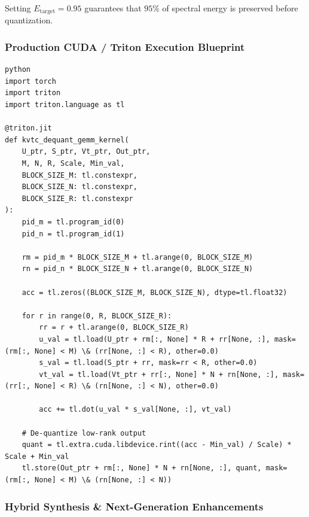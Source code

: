 Setting $E_{\text{target}} = 0.95$ guarantees that $95\%$ of spectral energy is preserved before quantization.


\subsubsection*{Production CUDA / Triton Execution Blueprint}

\vspace{0.5em}
\begin{mdframed}[backgroundcolor=codebg, linecolor=codeframe, linewidth=1pt, roundcorner=4pt, innerleftmargin=2pt, innerrightmargin=5pt, innertopmargin=5pt, innerbottommargin=5pt]
\begin{lstlisting}
python
import torch
import triton
import triton.language as tl

@triton.jit
def kvtc_dequant_gemm_kernel(
    U_ptr, S_ptr, Vt_ptr, Out_ptr,
    M, N, R, Scale, Min_val,
    BLOCK_SIZE_M: tl.constexpr,
    BLOCK_SIZE_N: tl.constexpr,
    BLOCK_SIZE_R: tl.constexpr
):
    pid_m = tl.program_id(0)
    pid_n = tl.program_id(1)

    rm = pid_m * BLOCK_SIZE_M + tl.arange(0, BLOCK_SIZE_M)
    rn = pid_n * BLOCK_SIZE_N + tl.arange(0, BLOCK_SIZE_N)

    acc = tl.zeros((BLOCK_SIZE_M, BLOCK_SIZE_N), dtype=tl.float32)

    for r in range(0, R, BLOCK_SIZE_R):
        rr = r + tl.arange(0, BLOCK_SIZE_R)
        u_val = tl.load(U_ptr + rm[:, None] * R + rr[None, :], mask=(rm[:, None] < M) \& (rr[None, :] < R), other=0.0)
        s_val = tl.load(S_ptr + rr, mask=rr < R, other=0.0)
        vt_val = tl.load(Vt_ptr + rr[:, None] * N + rn[None, :], mask=(rr[:, None] < R) \& (rn[None, :] < N), other=0.0)

        acc += tl.dot(u_val * s_val[None, :], vt_val)

    # De-quantize low-rank output
    quant = tl.extra.cuda.libdevice.rint((acc - Min_val) / Scale) * Scale + Min_val
    tl.store(Out_ptr + rm[:, None] * N + rn[None, :], quant, mask=(rm[:, None] < M) \& (rn[None, :] < N))
\end{lstlisting}
\end{mdframed}
\vspace{0.5em}


\subsubsection*{Hybrid Synthesis \& Next-Generation Enhancements}

